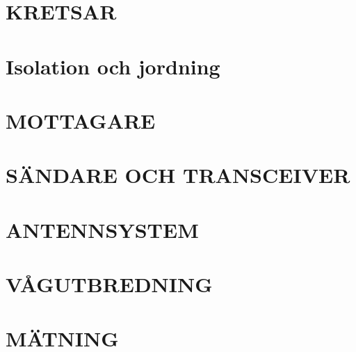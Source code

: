 \documentclass[a4paper,twoside,openright]{book}
\begin{document}
\chapter{KRETSAR}










\chapter{Isolation och jordning}


\chapter{MOTTAGARE}










\chapter{SÄNDARE OCH TRANSCEIVER}



\chapter{ANTENNSYSTEM}







\chapter{VÅGUTBREDNING}
\label{vågutbredning}







\chapter{MÄTNING}


\end{document}
